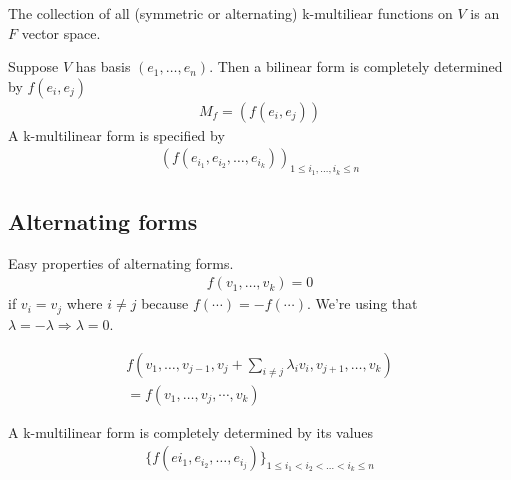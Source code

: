\documentclass[class=scrartcl, crop=false]{standalone}
\begin{document}
The collection of all (symmetric or alternating) k-multiliear functions on $V$ is an $F$ vector space. 
\begin{lemma}
  Suppose $V$ has basis $(e_1, \dots, e_n)$. Then a bilinear form is completely determined by $f(e_i, e_j)$
  \begin{gather*}
    M_f = (f(e_i, e_j))
  \end{gather*} 
  A k-multilinear form is specified by 
  \begin{gather*}
    (f(e_{i_1}, e_{i_2}, \dots, e_{i_k}))_{1 \leq i_1, \dots, i_k \leq n}
  \end{gather*} 
\end{lemma} 

\subsection{Alternating forms}

Easy properties of alternating forms. 
\begin{gather*}
  f(v_1, \dots, v_k) = 0
\end{gather*} 
if $v_i = v_j$ where  $i \neq j$ because $f(\cdots) = -f(\cdots)$. We're using that $\lambda = -\lambda \Rightarrow \lambda = 0$.

\begin{gather*}
  f(v_1, \dots, v_{j - 1}, v_j + \sum_{i \neq j}\lambda_iv_i, v_{j + 1}, \dots, v_k) \\
  = f(v_1, \dots, v_j, \cdots, v_k)
\end{gather*} 

\begin{proposition}
  A k-multilinear form is completely determined by its values
  \begin{gather*}
    \{
      f(e{i_1}, e_{i_2}, \dots, e_{i_j})
    \}_{1 \leq i_1 < i_2 < \dots < i_k \leq n}
  \end{gather*} 
\end{proposition} 
\end{document}
